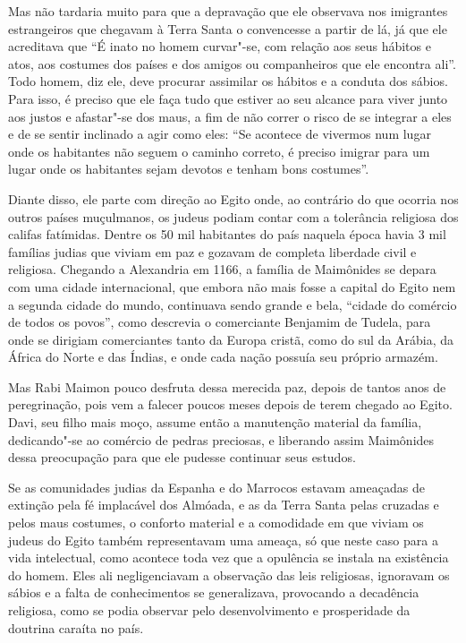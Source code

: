 Mas não tardaria muito para que a depravação que ele observava nos
imigrantes estrangeiros que chegavam à Terra Santa o convencesse a
partir de lá, já que ele acreditava que ``É inato no homem curvar"-se,
com relação aos seus hábitos e atos, aos costumes dos países e dos
amigos ou companheiros que ele encontra ali''. Todo homem, diz ele, deve
procurar assimilar os hábitos e a conduta dos sábios. Para isso, é
preciso que ele faça tudo que estiver ao seu alcance para viver junto
aos justos e afastar"-se dos maus, a fim de não correr o risco de se
integrar a eles e de se sentir inclinado a agir como eles: ``Se acontece
de vivermos num lugar onde os habitantes não seguem o caminho correto, é
preciso imigrar para um lugar onde os habitantes sejam devotos e tenham
bons costumes''.

Diante disso, ele parte com direção ao Egito onde, ao contrário do que
ocorria nos outros países muçulmanos, os judeus podiam contar com a
tolerância religiosa dos califas fatímidas. Dentre os 50 mil habitantes
do país naquela época havia 3 mil famílias judias que viviam em paz e
gozavam de completa liberdade civil e religiosa. Chegando a Alexandria
em 1166, a família de Maimônides se depara com uma cidade internacional,
que embora não mais fosse a capital do Egito nem a segunda cidade do
mundo, continuava sendo grande e bela, ``cidade do comércio de todos os
povos'', como descrevia o comerciante Benjamim de Tudela, para onde se
dirigiam comerciantes tanto da Europa cristã, como do sul da Arábia, da
África do Norte e das Índias, e onde cada nação possuía seu próprio
armazém.

Mas Rabi Maimon pouco desfruta dessa merecida paz, depois de tantos
anos de peregrinação, pois vem a falecer poucos meses depois de terem
chegado ao Egito. Davi, seu filho mais moço, assume então a manutenção
material da família, dedicando"-se ao comércio de pedras preciosas, e
liberando assim Maimônides dessa preocupação para que ele pudesse
continuar seus estudos.

Se as comunidades judias da Espanha e do Marrocos estavam ameaçadas de
extinção pela fé implacável dos Almóada, e as da Terra Santa pelas
cruzadas e pelos maus costumes, o conforto material e a comodidade em
que viviam os judeus do Egito também representavam uma ameaça, só que
neste caso para a vida intelectual, como acontece toda vez que a
opulência se instala na existência do homem. Eles ali negligenciavam a
observação das leis religiosas, ignoravam os sábios e a falta de
conhecimentos se generalizava, provocando a decadência religiosa, como
se podia observar pelo desenvolvimento e prosperidade da doutrina
caraíta no país.

